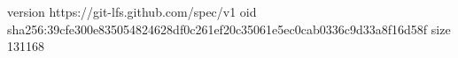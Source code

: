 version https://git-lfs.github.com/spec/v1
oid sha256:39cfe300e835054824628df0c261ef20c35061e5ec0cab0336c9d33a8f16d58f
size 131168
